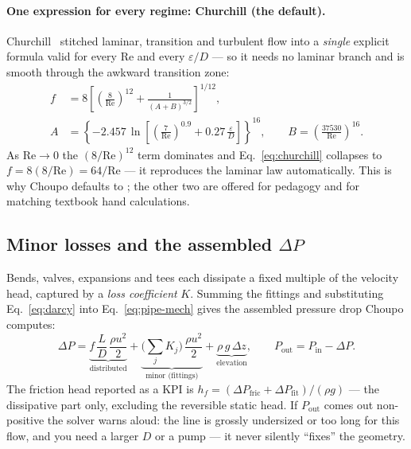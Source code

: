 \documentclass[11pt,a4paper]{article}
\begin{document}
\paragraph{One expression for every regime: Churchill (the default).}
Churchill~\cite{Churchill1977} stitched laminar, transition and turbulent
flow into a \emph{single} explicit formula valid for every $\mathrm{Re}$
and every $\varepsilon/D$ --- so it needs no laminar branch and is smooth
through the awkward transition zone:
\begin{align}
   f &= 8\left[\left(\frac{8}{\mathrm{Re}}\right)^{12}
              + \frac{1}{(A+B)^{3/2}}\right]^{1/12},
   \label{eq:churchill}\\[2pt]
   A &= \left\{-2.457\,\ln\!\left[
        \left(\frac{7}{\mathrm{Re}}\right)^{0.9}
        + 0.27\,\frac{\varepsilon}{D}\right]\right\}^{16},
   \qquad
   B = \left(\frac{37530}{\mathrm{Re}}\right)^{16}.
   \nonumber
\end{align}
As $\mathrm{Re}\to0$ the $(8/\mathrm{Re})^{12}$ term dominates and
Eq.~\eqref{eq:churchill} collapses to $f = 8(8/\mathrm{Re}) =
64/\mathrm{Re}$ --- it reproduces the laminar law automatically.  This is
why Choupo defaults to ; the other two are offered for
pedagogy and for matching textbook hand calculations.

\subsection{Minor losses and the assembled \texorpdfstring{$\Delta
P$}{dP}}

Bends, valves, expansions and tees each dissipate a fixed multiple of the
velocity head, captured by a \emph{loss coefficient} $K$.  Summing the
fittings and substituting Eq.~\eqref{eq:darcy} into
Eq.~\eqref{eq:pipe-mech} gives the assembled pressure drop Choupo
computes:
\begin{equation}
   \boxed{\;
   \Delta P
   = \underbrace{f\,\frac{L}{D}\,\frac{\rho u^2}{2}}_{\text{distributed}}
   + \underbrace{\Big(\textstyle\sum_j K_j\Big)\,\frac{\rho u^2}{2}}_{\text{minor (fittings)}}
   + \underbrace{\rho\,g\,\Delta z}_{\text{elevation}},
   \qquad P_{\text{out}} = P_{\text{in}} - \Delta P.
   \;}
   \label{eq:pipe-total}
\end{equation}
The friction head reported as a KPI is $h_f = (\Delta P_{\text{fric}} +
\Delta P_{\text{fit}})/(\rho g)$ --- the dissipative part only, excluding
the reversible static head.  If $P_{\text{out}}$ comes out non-positive the
solver warns aloud: the line is grossly undersized or too long for this
flow, and you need a larger $D$ or a pump --- it never silently ``fixes''
the geometry.
\end{document}

